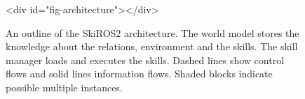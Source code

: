\begin{figure}[tpb]
	{
		\setlength{\fboxrule}{0pt}
	}
	\caption{An outline of the SkiROS2 architecture. The world model stores the knowledge about the relations, environment and the skills. The skill manager loads and executes the skills. Dashed lines show control flows and solid lines information flows. Shaded blocks indicate possible multiple instances.}
	<div id="fig-architecture"></div>

\end{figure}